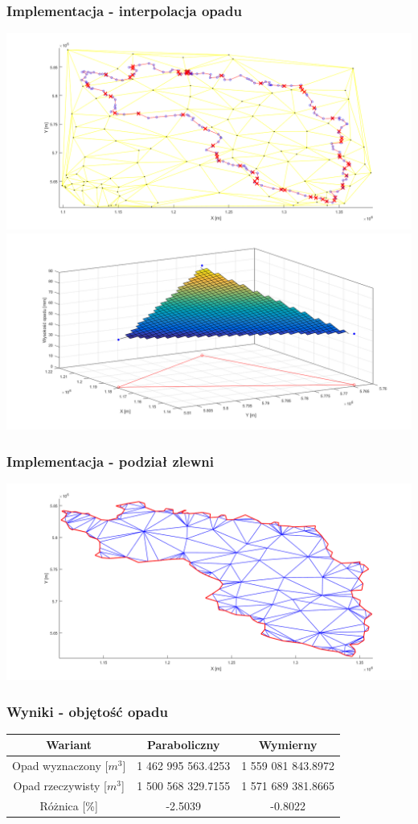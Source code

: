 \documentclass{beamer}
\begin{document}
\begin{frame}
\frametitle{Implementacja - interpolacja opadu}
\begin{minipage}[t]{\linewidth}
\includegraphics[width=.5\textwidth]{./../img/punkty_do_interpolacji.png}
\includegraphics[width=.5\textwidth]{./../img/prezentacja_interpolacji.png}
\end{minipage}
\end{frame}
\begin{frame}
\frametitle{Implementacja - podział zlewni}
\begin{minipage}[t]{\linewidth}
\centering
\includegraphics[width=.8\textwidth]{./../img/druga_triangulacja_z_ograniczeniem.png}
\end{minipage}
\end{frame}


\begin{frame}
\frametitle{Wyniki - objętość opadu}
\begin{table}[!ht]
\begin{center}
\begin{tabular}{|c|c|c|}
\hline
 Wariant                 &  Paraboliczny      & Wymierny \\ \hline
Opad wyznaczony [$m^3$]  &  1 462 995 563.4253  & 1 559 081 843.8972 \\ \hline
Opad rzeczywisty [$m^3$] & 1 500 568 329.7155 & 1 571 689 381.8665 \\ \hline
Różnica [\%] & -2.5039 & -0.8022 \\ \hline
\end{tabular}
\end{center}
\end{table}
\end{frame}
\end{document}
